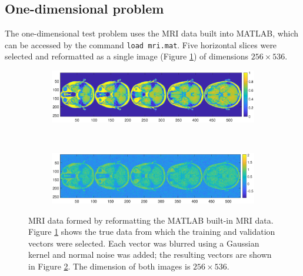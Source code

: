 \documentclass[12pt]{article}
\begin{document}
\subsection{One-dimensional problem} \label{sec:1D}
The one-dimensional test problem uses the MRI data built into MATLAB, which can be accessed by the command \texttt{load mri.mat}. Five horizontal slices were selected and reformatted as a single image (Figure \ref{fig:MRI 1D True}) of dimensions $256 \times 536$. 

\begin{figure}[ht]
\begin{subfigure}{\textwidth}
\includegraphics[scale=0.36]{Figures/Full_MRI}
\subcaption{}
\label{fig:MRI 1D True}
\end{subfigure} \\
\begin{subfigure}{\textwidth}
\includegraphics[scale=0.36]{Figures/Noisy_MRI}
\subcaption{}
\label{fig:MRI 1D Noisy}
\end{subfigure}
\caption{MRI data formed by reformatting the MATLAB built-in MRI data. Figure \ref{fig:MRI 1D True} shows the true data from which the training and validation vectors were selected. Each vector was blurred using a Gaussian kernel and normal noise was added; the resulting vectors are shown in Figure \ref{fig:MRI 1D Noisy}. The dimension of both images is $256 \times 536$.}
\label{fig:MRI 1D}
\end{figure}
\end{document}
